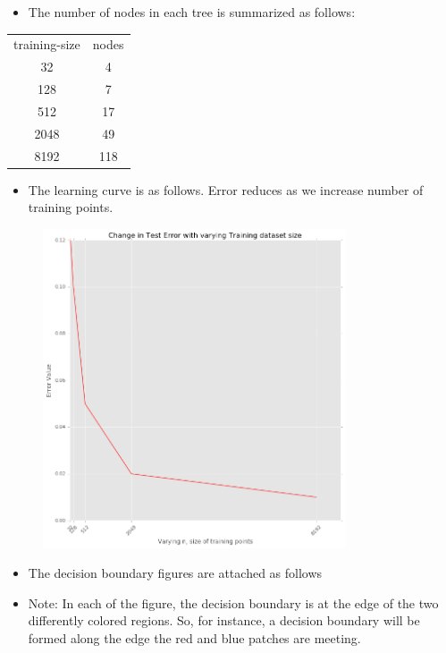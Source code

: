 \documentclass[a4paper]{article}
\theoremstyle{definition}
\newenvironment{soln}{
    \leavevmode\color{blue}\ignorespaces
}{}
\begin{document}
\begin{soln}
	\begin{itemize}
		\item The number of nodes in each tree is summarized as follows: 	
	\end{itemize}
	\begin{center}
	\begin{tabular}{ c c }
		training-size &  nodes \\
		32 &  4\\ 
		128 & 7 \\
		512 & 17 \\
		2048 & 49  \\
		8192 & 118
	\end{tabular}
\end{center}

\begin{itemize}
	\item The learning curve is as follows. Error reduces as we increase number of training points.
\end{itemize}

\begin{figure}[H]
	\centering
	\includegraphics[width=0.8\textwidth]{err_n.png}
	\captionsetup{labelformat=empty}
	\caption{}
	\label{fig:my_label}
\end{figure}


\begin{itemize}
	\item The decision boundary figures are attached as follows
	\item Note: In each of the figure, the decision boundary is at the edge of the two differently colored regions. So, for instance, a decision boundary will be formed along the edge the red and blue patches are meeting.


\end{itemize}
\end{soln}
\end{document}
